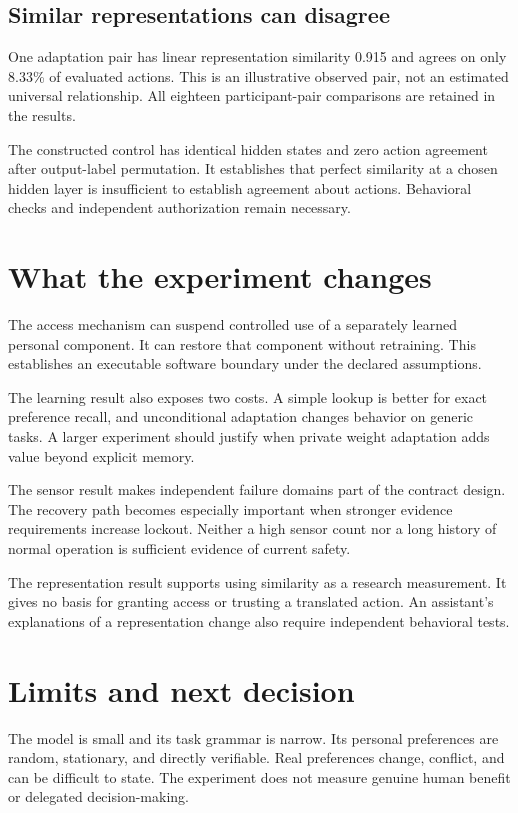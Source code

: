 \documentclass[11pt]{article}
\begin{document}
\subsection{Similar representations can disagree}
One adaptation pair has linear representation similarity 0.915 and agrees on only 8.33\% of evaluated actions.
This is an illustrative observed pair, not an estimated universal relationship.
All eighteen participant-pair comparisons are retained in the results.

The constructed control has identical hidden states and zero action agreement after output-label permutation.
It establishes that perfect similarity at a chosen hidden layer is insufficient to establish agreement about actions.
Behavioral checks and independent authorization remain necessary.

\section{What the experiment changes}
The access mechanism can suspend controlled use of a separately learned personal component.
It can restore that component without retraining.
This establishes an executable software boundary under the declared assumptions.

The learning result also exposes two costs.
A simple lookup is better for exact preference recall, and unconditional adaptation changes behavior on generic tasks.
A larger experiment should justify when private weight adaptation adds value beyond explicit memory.

The sensor result makes independent failure domains part of the contract design.
The recovery path becomes especially important when stronger evidence requirements increase lockout.
Neither a high sensor count nor a long history of normal operation is sufficient evidence of current safety.

The representation result supports using similarity as a research measurement.
It gives no basis for granting access or trusting a translated action.
An assistant's explanations of a representation change also require independent behavioral tests.

\section{Limits and next decision}
The model is small and its task grammar is narrow.
Its personal preferences are random, stationary, and directly verifiable.
Real preferences change, conflict, and can be difficult to state.
The experiment does not measure genuine human benefit or delegated decision-making.
\end{document}
